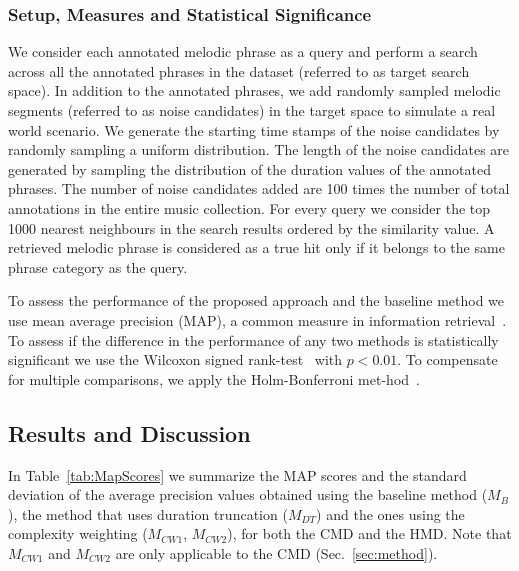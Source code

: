 \subsubsection{Setup, Measures and Statistical Significance}
\label{sec:patterns_improving_similarity_experimental_setup}

We consider each annotated melodic phrase as a query and perform a search across all the annotated phrases in the dataset (referred to as target search space). %
In addition to the annotated phrases, we add randomly sampled melodic segments (referred to as noise candidates) in the target space to simulate a real world scenario. We generate the starting time stamps of the noise candidates by randomly sampling a uniform distribution. The length of the noise candidates are generated by sampling the distribution of the duration values of the annotated phrases. The number of noise candidates added are 100 times the number of total annotations in the entire music collection. For every query we consider the top 1000 nearest neighbours in the search results ordered by the similarity value. A retrieved melodic phrase is considered as a true hit only if it belongs to the same phrase category as the query.

To assess the performance of the proposed approach and the baseline method we use mean average precision (MAP), a common measure in information retrieval~\cite{manning2008introduction}. To assess if the difference in the performance of any two methods is statistically significant we use the Wilcoxon signed rank-test~\cite{wilcoxon1945individual} with $p < 0.01$. To compensate for multiple comparisons, we apply the Holm-Bonferroni met-hod~\cite{holm1979simple}.


\subsection{Results and Discussion}
\label{sec:patterns_improving_similarity_results_and_discussion}

In Table~\ref{tab:MapScores} we summarize the MAP scores and the standard deviation of the average precision values obtained using the baseline method ($M_{B}$), the method that uses duration truncation ($M_{DT}$) and the ones using the complexity weighting ($M_{CW1}$, $M_{CW2}$), for both the CMD and the HMD. Note that $M_{CW1}$ and $M_{CW2}$ are only applicable to the CMD (Sec.~\ref{sec:method}).


